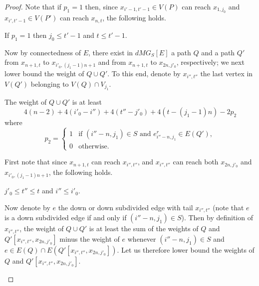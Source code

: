 \begin{proof}
Note that if $p_1 = 1$ then, since $x_{i'-1,t'-1} \in V(P)$ can reach $x_{1,j_0}$ and $x_{i',t'-1} \in V(P')$ can reach $x_{n,t}$, the following holds.

\begin{observation}
\label{obs:p1}
If $p_1 = 1$ then $j_0 \leq t'-1$ and $t \leq t'-1$.
\end{observation} 

Now by connectedness of $E$, there exist in $dMG_S[E]$ a path $Q$ and a path $Q'$ from $x_{n+1,t}$ to $x_{i'_0,(j_1-1)n+1}$ and from $x_{n+1,t}$ to $x_{2n,j'_0}$, respectively; we next lower bound the weight of $Q \cup Q'$. To this end, denote by $x_{i'',t''}$ the last vertex in $V(Q')$ belonging to $V(Q) \cap V_{j_1}$. 

\begin{claim}
\label{clm:weightQQ'}
The weight of $Q \cup Q'$ is at least 
\[
4(n-2) + 4(i'_0-i'') + 4(t''-j'_0) + 4(t-(j_1-1)n) - 2p_2
\]
where 
$$
p_2 = \left\{
    \begin{array}{ll}
        1 & \mbox{if } (i''-n,j_1) \in S \mbox{ and } e^r_{i''-n,j_1} \in E(Q'),\\
        0 & \mbox{otherwise.}
    \end{array}
\right.
$$
\end{claim}

\begin{claimproof}
First note that since $x_{n+1,t}$ can reach $x_{i'',t''}$, and $x_{i'',t''}$ can reach both $x_{2n,j'_0}$ and $x_{i'_0,(j_1-1)n+1}$, the following holds.

\begin{observation}
\label{obs:t''}
$j'_0 \leq t'' \leq t$ and $i'' \leq i'_0$. 
\end{observation}

Now denote by $e$ the down or down subdivided edge with tail $x_{i'',t''}$ (note that $e$ is a down subdivided edge if and only if $(i''-n,j_1) \in S$). Then by definition of $x_{i'',t''}$, the weight of $Q \cup Q'$ is at least the sum of the weights of $Q$ and $Q'[x_{i'',t''},x_{2n,j'_0}]$ minus the weight of $e$ whenever $(i''-n,j_1) \in S$ and $e \in E(Q) \cap E(Q'[x_{i'',t''},x_{2n,j'_0}])$. Let us therefore lower bound the weights of $Q$ and $Q'[x_{i'',t''},x_{2n,j'_0}]$. 


\end{claimproof}
\end{proof}
